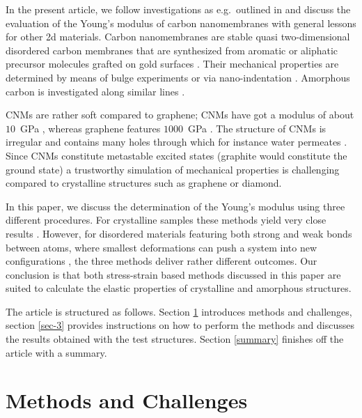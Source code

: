 \documentclass[preprint,12pt]{elsarticle}
\newcommand{\xref}[1]{\protect\ref{#1}}
\begin{document}
In the present article, we follow investigations as e.g.\ outlined in \cite{CDB:MS17,GEH:PE18}
and discuss the evaluation of the Young's modulus of carbon nanomembranes with general
lessons for other 2d materials. Carbon nanomembranes are stable 
quasi two-dimensional disordered 
carbon membranes that are synthesized from aromatic or aliphatic precursor molecules 
grafted on 
gold surfaces \cite{GSE:APL99,LEK:CR05,TBN:AM09,AVW:ASCN13,TuG:AM16,Tur:AdP17,DWN:PCCP19,WEG:2DM19,SWA:JPCC19,EGV:PRB21,SKY:BN22}. 
Their mechanical properties are determined by means of bulge 
experiments or via nano-indentation \cite{ZBG:B11}. 
Amorphous carbon is investigated along similar lines \cite{LXS:ASS13}.

CNMs are rather soft compared to graphene; CNMs have got a modulus 
of about $10$~GPa \cite{ZBG:B11}, whereas graphene features $1000$~GPa 
\cite{FPJ:PRB07,LWK:S08,GEH:PE18}. The structure of
CNMs is irregular and contains many holes through which for instance 
water permeates \cite{YDB:ACSnano18,YHQ:AM20}. Since CNMs constitute metastable excited 
states (graphite would constitute the ground state) a trustworthy 
simulation of mechanical properties is challenging compared to crystalline 
structures such as graphene or diamond.

In this paper, we discuss the determination of the Young's modulus using three
different procedures. For crystalline samples these methods yield very close results \cite{GEH:PE18}. 
However, for disordered materials featuring both strong and weak bonds between atoms, 
where smallest deformations can push a system into new configurations \cite{PSH:CMS24}, 
the three methods deliver rather different outcomes. 
Our conclusion is that both stress-strain based methods discussed in this paper
are suited to calculate the elastic properties of crystalline and amorphous structures.

The article is structured as follows. Section \xref{sec-2} introduces methods and 
challenges, section \xref{sec-3} provides instructions on how to perform the methods 
and discusses the results obtained with the test structures. 
Section \xref{summary} finishes off the article with a summary. 




\section{Methods and Challenges}
\label{sec-2}
\end{document}

